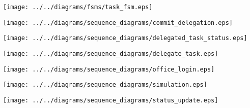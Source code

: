    \begin{frame}
    \begin{center}
    \texttt{[image: ../../diagrams/fsms/task\_fsm.eps]}
    \end{center}
    \end{frame}
    

    \begin{frame}
    \begin{center}
    \texttt{[image: ../../diagrams/sequence\_diagrams/commit\_delegation.eps]}
    \end{center}
    \end{frame}
    

    \begin{frame}
    \begin{center}
    \texttt{[image: ../../diagrams/sequence\_diagrams/delegated\_task\_status.eps]}
    \end{center}
    \end{frame}
    

    \begin{frame}
    \begin{center}
    \texttt{[image: ../../diagrams/sequence\_diagrams/delegate\_task.eps]}
    \end{center}
    \end{frame}
    

    \begin{frame}
    \begin{center}
    \texttt{[image: ../../diagrams/sequence\_diagrams/office\_login.eps]}
    \end{center}
    \end{frame}
    

    \begin{frame}
    \begin{center}
    \texttt{[image: ../../diagrams/sequence\_diagrams/simulation.eps]}
    \end{center}
    \end{frame}
    

    \begin{frame}
    \begin{center}
    \texttt{[image: ../../diagrams/sequence\_diagrams/status\_update.eps]}
    \end{center}
    \end{frame}
    
